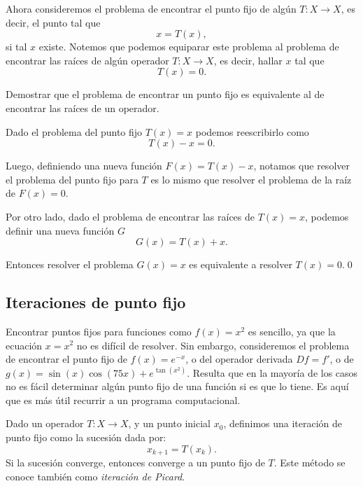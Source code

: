 \documentclass[12pt]{book}
\begin{document}
Ahora consideremos el problema de encontrar el punto fijo de algún $T:X\to X$, es decir, el punto tal que
\[
    x=T(x),
\]
si tal $x$ existe. Notemos que podemos equiparar este problema al problema de encontrar las raíces de algún operador $T:X\to X$, es decir, hallar $x$ tal que
\[
    T(x)=0.
\]

\begin{exampleenv}
Demostrar que el problema de encontrar un punto fijo es equivalente al de encontrar las raíces de un operador.

Dado el problema del punto fijo $T(x)=x$ podemos reescribirlo como
\[
    T(x)-x=0.
\]

Luego, definiendo una nueva función $F(x)=T(x)-x$, notamos que resolver el problema del punto fijo para $T$ es lo mismo que resolver el problema de la raíz de $F(x)=0$.

Por otro lado, dado el problema de encontrar las raíces de $T(x)=x$, podemos definir una nueva función $G$
\[
    G(x)=T(x)+x.
\]

Entonces resolver el problema $G(x)=x$ es equivalente a resolver $T(x)=0$.\qed\\
\end{exampleenv}

\subsection{Iteraciones de punto fijo}
\noindent
Encontrar puntos fijos para funciones como $f(x)=x^2$ es sencillo, ya que la ecuación $x=x^2$ no es difícil de resolver. Sin embargo, consideremos el problema de encontrar el punto fijo de $f(x)=e^{-x}$, o del operador derivada $Df=f'$, o de $g(x)=\sin(x)\cos(75x)+e^{\tan(x^2)}$. Resulta que en la mayoría de los casos no es fácil determinar algún punto fijo de una función si es que lo tiene. Es aquí que es más útil recurrir a un programa computacional.

\begin{definitionenv}
    Dado un operador $T:X\to X$, y un punto inicial $x_0$, definimos una iteración de punto fijo como la sucesión dada por:
    \[
        x_{k+1}=T(x_k).
    \]
    Si la sucesión converge, entonces converge a un punto fijo de $T$. Este método se conoce también como \emph{iteración de Picard}.
\end{definitionenv}
\end{document}
